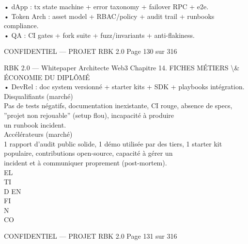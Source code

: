 \vspace{0.5em}
• dApp : tx state machine + error taxonomy + failover RPC + e2e.\\
\vspace{0.5em}
• Token Arch : asset model + RBAC/policy + audit trail + runbooks compliance.\\
\vspace{0.5em}
• QA : CI gates + fork suite + fuzz/invariants + anti-flakiness.\\
\vspace{0.5em}
\vspace{0.5em}
\begin{confidential}CONFIDENTIEL — PROJET RBK 2.0                                  Page 130 sur 316\end{confidential}
RBK 2.0 — Whitepaper Architecte Web3                                                Chapitre 14. FICHES MÉTIERS \textbackslash{}& ÉCONOMIE DU DIPLÔMÉ\\
\vspace{0.5em}
\vspace{0.5em}
• DevRel : doc system versionné + starter kits + SDK + playbooks intégration.\\
\vspace{0.5em}
Disqualifiants (marché)\\
\vspace{0.5em}
Pas de tests négatifs, documentation inexistante, CI rouge, absence de specs, ”projet non rejouable” (setup flou), incapacité à produire\\
un runbook incident.\\
\vspace{0.5em}
Accélérateurs (marché)\\
1 rapport d’audit public solide, 1 démo utilisée par des tiers, 1 starter kit populaire, contributions open-source, capacité à gérer un\\
incident et à communiquer proprement (post-mortem).\\
\vspace{0.5em}
\vspace{0.5em}
\vspace{0.5em}
\vspace{0.5em}
EL\\
TI\\
D    EN\\
FI\\
N\\
CO\\
\vspace{0.5em}
\vspace{0.5em}
\vspace{0.5em}
\vspace{0.5em}
\begin{confidential}CONFIDENTIEL — PROJET RBK 2.0                                 Page 131 sur 316\end{confidential}
